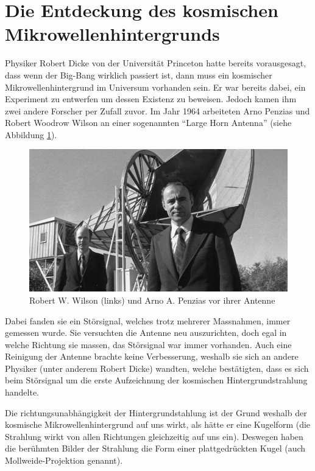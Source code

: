 \section{Die Entdeckung des kosmischen Mikrowellenhintergrunds}
Physiker Robert Dicke von der Universität Princeton hatte bereits vorausgesagt, dass wenn der Big-Bang wirklich passiert ist, dann muss ein kosmischer Mikrowellenhintergrund im Universum vorhanden sein. Er war bereits dabei, ein Experiment zu entwerfen um dessen Existenz zu beweisen. Jedoch kamen ihm zwei andere Forscher per Zufall zuvor.
Im Jahr 1964 arbeiteten Arno Penzias und Robert Woodrow Wilson an einer 
sogenannten ``Large Horn Antenna'' (siehe Abbildung \ref{fig:wilson_penzias}).
\begin{figure}
	\includegraphics[width=\linewidth]{cmb/images/penzias-wilson-large-horn-antenna.jpg}
	\caption{Robert W. Wilson (links) und Arno A. Penzias vor ihrer Antenne}
	\label{fig:wilson_penzias}
\end{figure}
Dabei fanden sie ein Störsignal, welches trotz mehrerer Massnahmen, immer gemessen wurde.
Sie versuchten die Antenne neu auszurichten, doch egal in welche Richtung sie massen,
das Störsignal war immer vorhanden.
Auch eine Reinigung der Antenne brachte keine Verbesserung, weshalb sie sich an 
andere Physiker (unter anderem Robert Dicke) wandten, welche bestätigten, dass es sich beim Störsignal um 
die erste Aufzeichnung der kosmischen Hintergrundstrahlung handelte.

Die richtungsunabhängigkeit der Hintergrundstahlung ist der Grund weshalb der kosmische Mikrowellenhintergrund auf uns wirkt, 
als hätte er eine Kugelform
(die Strahlung wirkt von allen Richtungen gleichzeitig auf uns ein).
Deswegen haben die berühmten Bilder der Strahlung die Form einer 
plattgedrückten Kugel (auch Mollweide-Projektion genannt).

